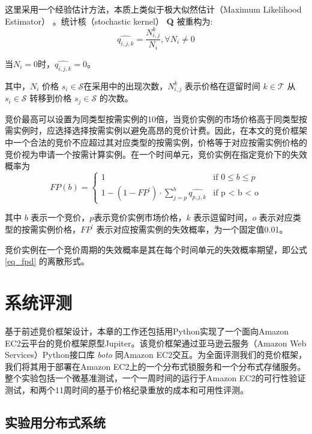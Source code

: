 这里采用一个经验估计方法，本质上类似于极大似然估计（Maximum Likelihood Estimator） \cite{Barbu:2008:SCH:1481376}。统计核（stochastic kernel） \textbf{Q} 被重构为:
\begin{equation}
\widehat{{q}_{i,j,k}} = \frac{N_{i, j}^{k}}{N_i}, \forall N_i \neq 0
\end{equation}

当$N_i = 0$时，$\widehat{{q}_{i,j,k}} = 0$。

其中，$N_i$ 价格 $s_i \in \mathcal{S}$在采用中的出现次数，$N_{i, j}^{k}$ 表示价格在逗留时间 $k \in \mathcal{T}$ 从 $s_i \in \mathcal{S}$ 转移到价格 $s_j \in \mathcal{S}$ 的次数。

竞价最高可以设置为同类型按需实例的10倍，当竞价实例的市场价格高于同类型按需实例时，应选择选择按需实例以避免高昂的竞价计费。因此，在本文的竞价框架中一个合法的竞价不应超过其对应类型的按需实例，价格等于对应按需实例价格的竞价视为申请一个按需计算实例。在一个时间单元，竞价实例在指定竞价下的失效概率为
\begin{equation}
FP(b) = 
\begin{cases}
1 &\mbox{if $0 \leq b \leq p$}\\
1 - (1 - FP^{\prime}) \cdot \sum\limits_{j=p}^b{\widehat{{q}_{p, j, k}}} &\mbox{if p < b < o}
\end{cases}
\end{equation}

其中 $b$ 表示一个竞价，$p$表示竞价实例市场价格，$k$ 表示逗留时间，$o$ 表示对应类型的按需实例价格，$FP^{\prime}$ 表示对应按需实例的失效概率，为一个固定值0.01。

竞价实例在一个竞价周期的失效概率是其在每个时间单元的失效概率期望，即公式 \eqref{eq_fpd} 的离散形式。

\section{系统评测}
\label{sec:jupiter-evaluation}
基于前述竞价框架设计，本章的工作还包括用Python实现了一个面向Amazon EC2云平台的竞价框架原型Jupiter。该竞价框架通过亚马逊云服务（Amazon Web Services）Python接口库 \emph{boto} \cite{boto:2014} 同Amazon EC2交互。为全面评测我们的竞价框架，我们将其用于部署在Amazon EC2上的一个分布式锁服务和一个分布式存储服务。整个实验包括一个微基准测试，一个一周时间的运行于Amazon EC2的可行性验证测试，和两个11周时间的基于价格纪录重放的成本和可用性评测。

\subsection{实验用分布式系统}
\label{subsec:jupiter-bc}

